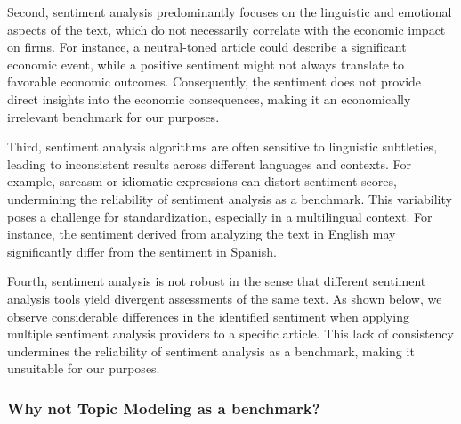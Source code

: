 Second, sentiment analysis predominantly focuses on the linguistic and emotional aspects of the text, which do not necessarily correlate with the economic impact on firms. For instance, a neutral-toned article could describe a significant economic event, while a positive sentiment might not always translate to favorable economic outcomes. Consequently, the sentiment does not provide direct insights into the economic consequences, making it an economically irrelevant benchmark for our purposes.


Third, sentiment analysis algorithms are often sensitive to linguistic subtleties, leading to inconsistent results across different languages and contexts. For example, sarcasm or idiomatic expressions can distort sentiment scores, undermining the reliability of sentiment analysis as a benchmark. 
This variability poses a challenge for standardization, especially in a multilingual context. For instance, the sentiment derived from analyzing the text in English may significantly differ from the sentiment in Spanish. 


Fourth, sentiment analysis is not robust in the sense that different sentiment analysis tools yield divergent assessments of the same text. As shown below, we observe considerable differences in the identified sentiment when applying multiple sentiment analysis providers to a specific article. This lack of consistency undermines the reliability of sentiment analysis as a benchmark, making it unsuitable for our purposes.





\subsubsection*{Why not Topic Modeling as a benchmark?}

